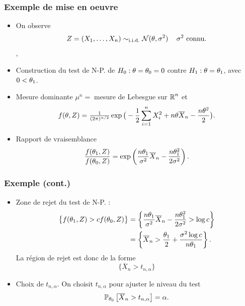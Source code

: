 \begin{frame}
\frametitle{Exemple de mise en oeuvre}
\begin{itemize}
\item On observe
$$Z=(X_1,\ldots, X_n) \sim_{\text{i.i.d.}} {\mathcal N}(\theta, \sigma^2) \, \quad \text{$\sigma^2$ connu}.$$,
\item \alert{Construction du test de N-P.} de $H_0:\theta = \theta_0= 0$ contre $H_1:\theta = \theta_1$, avec $0 < \theta_1$.
\item \alert{Mesure dominante} $\mu^n=\;$mesure de Lebesgue sur $\operatorname{{\mathbb R}}^n$ et
$$f(\theta, Z)=\tfrac{1}{(2\pi)^{n/2}}\exp\big(-\frac{1}{2}\sum_{i = 1}^n X_i^2+n\theta\overline{X}_n-\frac{n\theta^2}{2}\big).$$
\item \alert{Rapport de vraisemblance}
$$\frac{f(\theta_1,Z)}{f(\theta_0,Z)} = \exp\left(\frac{n \theta_1}{\sigma^2} \overline{X}_n  -\frac{n \theta_1^2}{2 \sigma^2} \right).$$
\end{itemize}
\end{frame}

\begin{frame}
\frametitle{Exemple (cont.)}
\begin{itemize}
\item \alert{Zone de rejet} du test de N-P. :
\begin{align*}
\big\{f(\theta_1,Z) >  cf(\theta_0,Z)\big\}&= \left\{ \frac{n \theta_1}{\sigma^2} \overline{X}_n-\frac{n \theta_1^2}{2 \sigma^2} > \log c\right\} \\
 &= \left\{\overline{X}_n > \frac{\theta_1}{2}+\frac{\sigma^2 \log c}{n \theta_1}\right\}.
\end{align*}
La région de rejet est donc de la forme
$$
\{ \overline{X}_n > t_{n,\alpha} \}
$$
\item \alert{Choix de $t_{n,\alpha}$}. On choisit $t_{n,\alpha}$ pour ajuster le niveau du test
$$\operatorname{{\mathbb P}}_{\theta_0}\big[\overline{X}_n > t_{n,\alpha}\big]=\alpha.$$
\end{itemize}
\end{frame}

